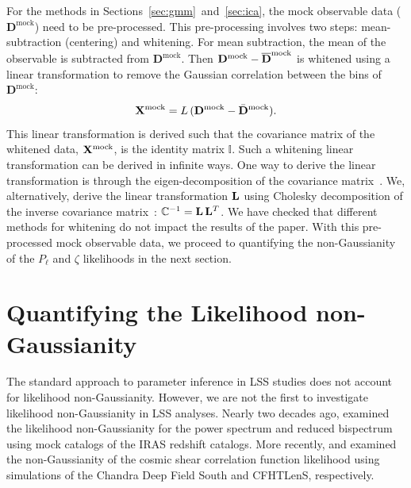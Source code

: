 \documentclass[12pt, letterpaper, preprint]{aastex}
\newcommand{\beq}{\begin{equation}}
\newcommand{\eeq}{\end{equation}}
\newcommand{\Dmock}{\mathbf{D}^\mathrm{mock}}
\newcommand{\Xmock}{{\bf X}^\mathrm{mock}}
\newcommand{\lss}{{\small{LSS}}\xspace}
\begin{document}
For the methods in Sections~\ref{sec:gmm}~and~\ref{sec:ica}, the mock 
observable data ($\Dmock$) need to be pre-processed. This pre-processing
involves two steps: mean-subtraction (centering) and whitening. For mean subtraction, 
the mean of the observable is subtracted from $\Dmock$. Then 
$\Dmock - \overline{\bf D}^\mathrm{mock}$ is whitened using a linear transformation 
to remove the Gaussian correlation between the bins of $\Dmock$: 
\beq
\Xmock = L\,(\Dmock - \bar{\bf D}^\mathrm{mock}). 
\eeq
This linear transformation is derived such that the covariance matrix of the whitened 
data, $\Xmock$, is the identity matrix $\mathbb{I}$. Such a whitening linear 
transformation can be derived in infinite ways. 
One way to derive the linear transformation is through the eigen-decomposition
of the covariance matrix~\citep[\emph{e.g.}][]{hartlap2009, sellentin2017}. We, alternatively, 
derive the linear transformation ${\bf L}$ using Cholesky decomposition of the 
inverse covariance matrix~\citep{Press:1992:NRC:148286}: 
$\mathbb{C}^{-1} = {\bf L}\,{\bf L}^T$. We have checked that different methods 
for whitening do not impact the results of the paper. With this pre-processed 
mock observable data, we proceed to quantifying 
the non-Gaussianity of the $P_\ell$ and $\zeta$ likelihoods in the next section. 


\section{Quantifying the Likelihood non-Gaussianity} \label{sec:div}
The standard approach to parameter inference in \lss studies does not 
account for likelihood non-Gaussianity. 
However, we are not the first to investigate likelihood non-Gaussianity 
in \lss analyses. Nearly two decades ago, \cite{scoccimarro2000} examined 
the likelihood non-Gaussianity for the power spectrum and reduced bispectrum 
using mock catalogs of the IRAS redshift catalogs. More recently, 
\cite{hartlap2009} and \cite{sellentin2017} examined the non-Gaussianity 
of the cosmic shear correlation function likelihood using simulations of 
the Chandra Deep Field South and CFHTLenS, respectively. 
\end{document}
